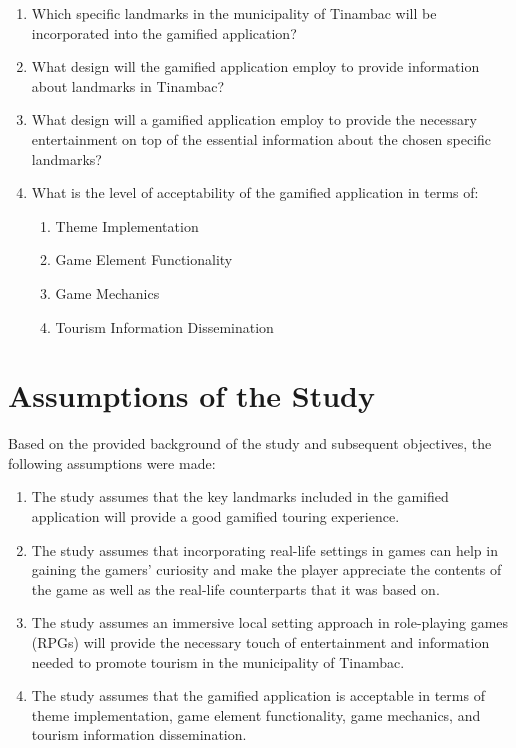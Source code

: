 \documentclass[11pt]{research}
\begin{document}
\begin{enumerate}
  \item Which specific landmarks in the municipality of Tinambac will be incorporated into the gamified application?
  \item What design will the gamified application employ to provide information about landmarks in Tinambac?
  \item What design will a gamified application employ to provide the necessary entertainment on top of the essential information about the chosen specific landmarks?
  \item What is the level of acceptability of the gamified application in terms of:
     \begin{enumerate}
          \item Theme Implementation
          \item Game Element Functionality
          \item Game Mechanics
          \item Tourism Information Dissemination
     \end{enumerate}
\end{enumerate}


\section{Assumptions of the Study}
Based on the provided background of the study and subsequent objectives, the following assumptions were made:     

\begin{enumerate}
  \item The study assumes that the key landmarks included in the gamified application will provide a good gamified touring experience.
  \item The study assumes that incorporating real-life settings in games can help in gaining the gamers' curiosity and make the player appreciate the contents of the game as well as the real-life counterparts that it was based on.
  \item The study assumes an immersive local setting approach in role-playing games (RPGs) will provide the necessary touch of entertainment and information needed to promote tourism in the municipality of Tinambac.
  \item The study assumes that the gamified application is acceptable in terms of theme implementation, game element functionality, game mechanics, and tourism information dissemination.
\end{enumerate}
\end{document}
